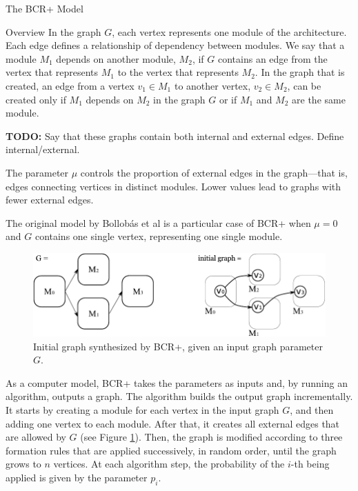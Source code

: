 \documentclass[11pt,twocolumn,a4paper,english]{article}
\newcommand{\TODO}{\textbf{TODO:} }
\begin{document}
\begin{section}{The BCR+ Model}
\begin{subsection}{Overview}
	In the graph $G$, each vertex represents one module of the architecture. Each edge defines a relationship of dependency between modules. We say that a module $M_1$ depends on another module, $M_2$, if $G$ contains an edge from the vertex that represents $M_1$ to the vertex that represents $M_2$. In the graph that is created, an edge from a vertex $v_1 \in M_1$ to another vertex, $v_2 \in M_2$, can be created only if $M_1$ depends on $M_2$ in the graph $G$ or if $M_1$ and $M_2$ are the same module.
	
		\TODO Say that these graphs contain both internal and external edges. Define internal/external.
		
	The parameter $\mu$ controls the proportion of external edges in the graph---that is, edges connecting vertices in distinct modules. Lower values lead to graphs with fewer external edges.
	
	The original model by Bollobás et al \cite{Bollobas2003} is a particular case of BCR+ when $\mu = 0$ and $G$ contains one single vertex, representing one single module.
	

\begin{figure}[htbp]
	\centering
		\includegraphics[scale=1]{figures/bcr-initial-graph}
	\caption{Initial graph synthesized by BCR+, given an input graph parameter $G$.}
	\label{fig:bcr-initial-graph}
\end{figure}
	
	As a computer model, BCR+ takes the parameters as inputs and, by running an algorithm, outputs a graph. The algorithm builds the output graph incrementally. It starts by creating a module for each vertex in the input graph $G$, and then adding one vertex to each module. After that, it creates all external edges that are allowed by $G$ (see Figure \ref{fig:bcr-initial-graph}). Then, the graph is modified according to three formation rules that are applied successively, in random order, until the graph grows to $n$ vertices. At each algorithm step, the probability of the $i$-th being applied is given by the parameter $p_i$.

\end{subsection}	


\end{section}
\end{document}
